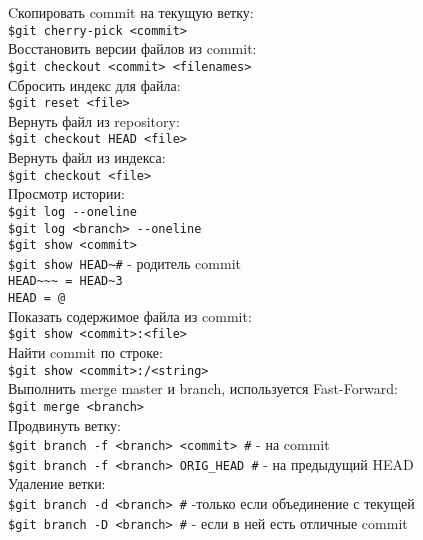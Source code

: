 \documentclass[12pt, a4paper]{article}
\begin{document}
\noindent Cкопировать commit на текущую ветку: \\
\indent \texttt{\$git cherry-pick <commit>}   \\

\noindent Восстановить версии файлов из commit:\\
\indent \texttt{\$git checkout <commit> <filenames>} \\
Сбросить индекс для файла: \\
\indent \texttt{\$git reset <file>} \\
Вернуть файл из repository: \\
\indent \texttt{\$git checkout HEAD <file>}  \\
Вернуть файл из индекса: \\
\indent \texttt{\$git checkout <file>}  \\

\noindent Просмотр истории: \\
\indent \texttt{\$git log {-}-oneline} \\
\indent \texttt{\$git log <branch> {-}-oneline} \\
\indent \texttt{\$git show <commit>} \\
\indent \texttt{\$git show HEAD\~  \indent \#} - родитель commit \\
\indent \indent \texttt{HEAD\~{}\~{}\~{} = HEAD\~{}3}  \\
\indent \indent \texttt{HEAD = @}  \\

\noindent Показать содержимое файла из commit: \\
\indent \texttt{\$git show <commit>:<file>} \\
\noindent Найти commit по строке: \\
\indent \texttt{\$git show <commit>:/<string>} \\

\noindent Выполнить merge master и branch, используется Fast-Forward: \\
\indent \texttt{\$git merge <branch>} \\

\noindent Продвинуть ветку: \\
\indent \texttt{\$git branch -f <branch> <commit> \indent \#} - на commit   \\
\indent \texttt{\$git branch -f <branch> ORIG\_HEAD \indent \#} - на предыдущий HEAD  \\

\noindent Удаление ветки: \\
\indent \texttt{\$git branch -d <branch> \indent \#} -только если объединение с текущей \\
\indent \texttt{\$git branch -D <branch> \indent \#} - если в ней есть отличные commit \\
\end{document}
